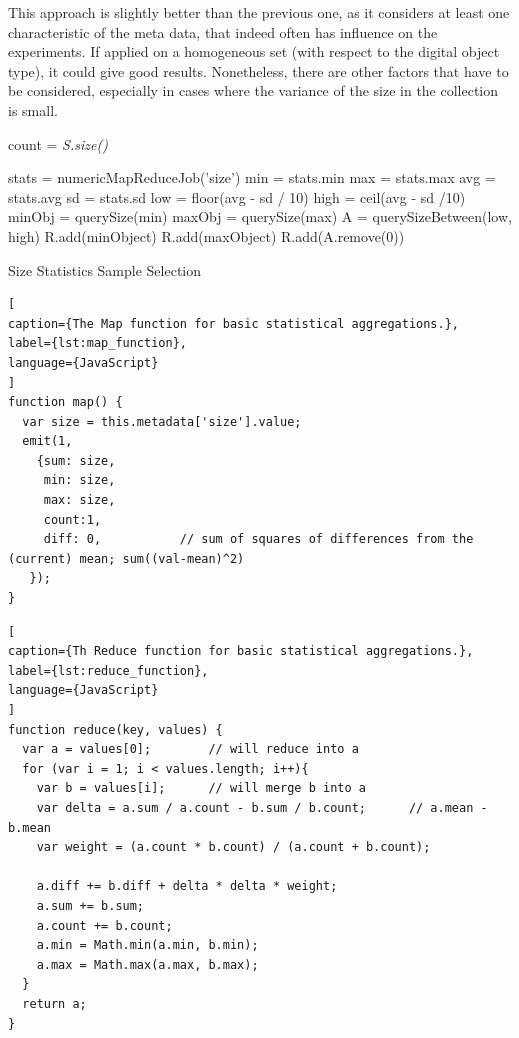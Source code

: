 This approach is slightly better than the previous one, as it considers at least one characteristic of the meta data, that indeed often has influence on the experiments. If applied on a homogeneous set (with respect to the digital object type), it could give good results. Nonetheless, there are other factors that have to be considered, especially in cases where the variance of the size in the collection is small.

\begin{algorithm}[bh]
\SetAlgoLined
{}

 \BlankLine

count = \textit{S.size()}\; 

stats = numericMapReduceJob('size')\;
min = stats.min\;
max = stats.max\;
avg = stats.avg\;
sd = stats.sd\;
low = floor(avg - sd / 10)\;
high = ceil(avg - sd /10)\;
\BlankLine
minObj  = querySize(min)\;
maxObj = querySize(max)\;
A = querySizeBetween(low, high)\;
\BlankLine
R.add(minObject)\;
R.add(maxObject)\;
\BlankLine
   {
    R.add(A.remove(0))\;
  }
 \caption{Size Statistics Sample Selection}
 \label{alg:size_selection}
\end{algorithm}


\vspace{1em}
\begin{lstlisting}[
caption={The Map function for basic statistical aggregations.},
label={lst:map_function},
language={JavaScript}
]
function map() {
  var size = this.metadata['size'].value;
  emit(1,
  	{sum: size, 
	 min: size,
	 max: size,
	 count:1,
	 diff: 0,			// sum of squares of differences from the (current) mean; sum((val-mean)^2)
   });
}
\end{lstlisting}


\begin{lstlisting}[
caption={Th Reduce function for basic statistical aggregations.},
label={lst:reduce_function},
language={JavaScript}
]
function reduce(key, values) {
  var a = values[0]; 		// will reduce into a
  for (var i = 1; i < values.length; i++){
    var b = values[i];		// will merge b into a
    var delta = a.sum / a.count - b.sum / b.count;		// a.mean - b.mean
    var weight = (a.count * b.count) / (a.count + b.count);
    
    a.diff += b.diff + delta * delta * weight;
    a.sum += b.sum;
    a.count += b.count;
    a.min = Math.min(a.min, b.min);
    a.max = Math.max(a.max, b.max);
  }
  return a;
}
\end{lstlisting}

